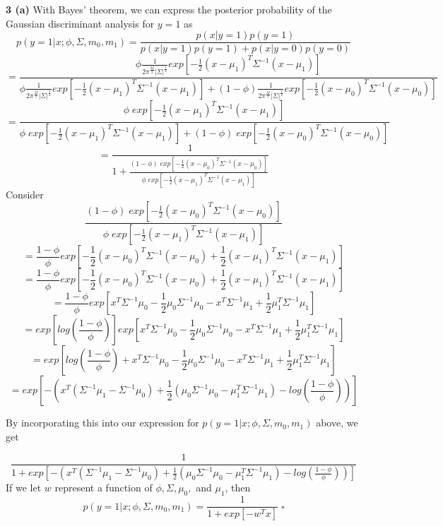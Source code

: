 \documentclass[12 pt]{article}        	%
\begin{document}
\newpage 
\textbf{3 (a)} With Bayes' theorem, we can express the posterior probability of the Gaussian discriminant analysis 
for $ y = 1 $ as 
\[
p( y = 1 | x; \phi, \Sigma, m_0, m_1 ) = 
\frac {p(x | y = 1) p(y = 1)} {p(x | y = 1) p(y = 1) + p(x | y = 0) p(y=0)}
\]
\[ 
  = \frac{
    \phi \frac{ 1 }{ 2 \pi^{\frac{M}{2}} | \Sigma |^{\frac{1}{2}} } 
    exp[ - \frac{1}{2} (x - \mu_1)^T \Sigma^{-1} (x - \mu_1) ]
  }{
    \phi \frac{ 1 }{ 2 \pi^{\frac{M}{2}} | \Sigma |^{\frac{1}{2}} }
    exp[ - \frac{1}{2} (x - \mu_1)^T \Sigma^{-1} (x - \mu_1) ]
    +
    (1 - \phi) \frac{ 1 }{ 2 \pi^{\frac{M}{2}} | \Sigma |^{\frac{1}{2}} }
    exp[ - \frac{1}{2} (x - \mu_0)^T \Sigma^{-1} (x - \mu_0) ]
  }
\]
\[
  = \frac{
    \phi \;
    exp[ - \frac{1}{2} (x - \mu_1)^T \Sigma^{-1} (x - \mu_1) ]
  }{
    \phi \;
    exp[ - \frac{1}{2} (x - \mu_1)^T \Sigma^{-1} (x - \mu_1) ]
    +
    (1 - \phi) \;
    exp[ - \frac{1}{2} (x - \mu_0)^T \Sigma^{-1} (x - \mu_0) ]
  }
\]
\[
  = \frac{1}{
    1 + \frac{
      (1 - \phi) \;
      exp[ - \frac{1}{2} (x - \mu_0)^T \Sigma^{-1} (x - \mu_0) ]
    }{
      \phi \;
      exp[ - \frac{1}{2} (x - \mu_1)^T \Sigma^{-1} (x - \mu_1) ]
    }
  }
\]
Consider 
\[
\frac{
      (1 - \phi) \;
      exp[ - \frac{1}{2} (x - \mu_0)^T \Sigma^{-1} (x - \mu_0) ]
    }{
      \phi \;
      exp[ - \frac{1}{2} (x - \mu_1)^T \Sigma^{-1} (x - \mu_1) ]
    }
\]
\[
  = \frac{1 - \phi}{\phi} 
  exp[ - \frac{1}{2} (x - \mu_0)^T \Sigma^{-1} (x - \mu_0) + \frac{1}{2} (x - \mu_1)^T \Sigma^{-1} (x - \mu_1) ]
\]
\[
  = \frac{1 - \phi}{\phi} 
  exp[ - \frac{1}{2} (x - \mu_0)^T \Sigma^{-1} (x - \mu_0) + \frac{1}{2} (x - \mu_1)^T \Sigma^{-1} (x - \mu_1) ]
\]
\[
  = \frac{1 - \phi}{\phi} 
  exp[
    x^T \Sigma^{-1} \mu_0 - \frac{1}{2} \mu_0 \Sigma^{-1} \mu_0 - x^T \Sigma^{-1} \mu_1 + \frac{1}{2} \mu_{1}^{T} \Sigma^{-1} \mu_1 
  ]
\]
\[
  = exp [ log( \frac{1 - \phi}{\phi} ) ]
  exp[
    x^T \Sigma^{-1} \mu_0 - \frac{1}{2} \mu_0 \Sigma^{-1} \mu_0 - x^T \Sigma^{-1} \mu_1 + \frac{1}{2} \mu_{1}^{T} \Sigma^{-1} \mu_1 
  ]
\]
\[
  = exp [ log( \frac{1 - \phi}{\phi} ) 
  +
    x^T \Sigma^{-1} \mu_0 - \frac{1}{2} \mu_0 \Sigma^{-1} \mu_0 - x^T \Sigma^{-1} \mu_1 + \frac{1}{2} \mu_{1}^{T} \Sigma^{-1} \mu_1 
  ]
\]
\[
  = exp [  
    - ( x^T ( \Sigma^{-1} \mu_1 - \Sigma^{-1} \mu_0 ) + \frac{1}{2} ( \mu_0 \Sigma^{-1} \mu_0 - \mu_{1}^{T} \Sigma^{-1} \mu_1 ) - log( \frac{1 - \phi}{\phi} ) )
  ]
\]

By incorporating this into our expression for $ p( y = 1 | x; \phi, \Sigma, m_0, m_1 ) $ above, we get

\[
  \frac{1}{
      1 + exp [  
      - ( x^T ( \Sigma^{-1} \mu_1 - \Sigma^{-1} \mu_0 ) + \frac{1}{2} ( \mu_0 \Sigma^{-1} \mu_0 - \mu_{1}^{T} \Sigma^{-1} \mu_1 ) - log( \frac{1 - \phi}{\phi} ) )
    ]
  }
\]
If we let $ w $ represent a function of $ \phi, \Sigma, \mu_0, $ and $ \mu_1 $, then 
\[
  p( y = 1 | x; \phi, \Sigma, m_0, m_1 ) 
  =
  \frac{1}{1 + exp[ -w^T x ]} \; \square
\]
\end{document}

